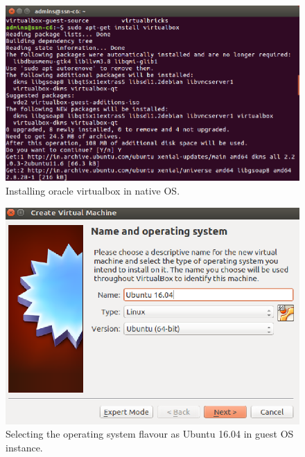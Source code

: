 \documentclass[a4paper,10pt]{article}
\begin{document}
\begin{figure}[h]
	\includegraphics[scale=0.25]{fig1.png}
	\caption{Installing oracle virtualbox in native OS.}
	\label{fig:1}
\end{figure}

\begin{figure}[h]
	\includegraphics[scale=0.25]{fig2.png}
	\caption{Selecting the operating system flavour as Ubuntu 16.04 in guest OS instance.}
	
	\label{fig:2}
\end{figure}
\end{document}
